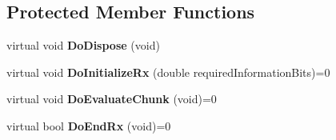 \subsection*{\-Protected \-Member \-Functions}
\begin{DoxyCompactItemize}
\item 
\hypertarget{classns3_1_1PLC__LinkPerformanceModel_a5051c7e4a3de68b28a7f64afbcc77701}{virtual void {\bfseries \-Do\-Dispose} (void)}\label{classns3_1_1PLC__LinkPerformanceModel_a5051c7e4a3de68b28a7f64afbcc77701}

\item 
\hypertarget{classns3_1_1PLC__LinkPerformanceModel_aa87e7c7b913eb11df941122299f96874}{virtual void {\bfseries \-Do\-Initialize\-Rx} (double required\-Information\-Bits)=0}\label{classns3_1_1PLC__LinkPerformanceModel_aa87e7c7b913eb11df941122299f96874}

\item 
\hypertarget{classns3_1_1PLC__LinkPerformanceModel_ac0050ee02310a2aa57f746da142cd062}{virtual void {\bfseries \-Do\-Evaluate\-Chunk} (void)=0}\label{classns3_1_1PLC__LinkPerformanceModel_ac0050ee02310a2aa57f746da142cd062}

\item 
\hypertarget{classns3_1_1PLC__LinkPerformanceModel_a7a5e8e08ad2f4dcd57a3a4aa48f1ddd5}{virtual bool {\bfseries \-Do\-End\-Rx} (void)=0}\label{classns3_1_1PLC__LinkPerformanceModel_a7a5e8e08ad2f4dcd57a3a4aa48f1ddd5}

\end{DoxyCompactItemize}
